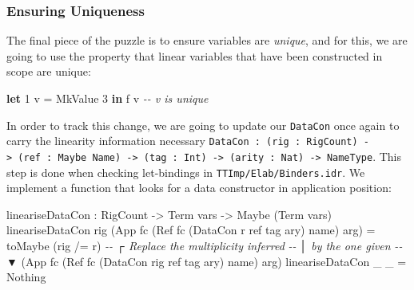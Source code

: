 \documentclass[
]{article}
\newenvironment{Shaded}{}{}
\newcommand{\CommentTok}[1]{\textcolor[rgb]{0.38,0.63,0.69}{\textit{#1}}}
\newcommand{\DataTypeTok}[1]{\textcolor[rgb]{0.56,0.13,0.00}{#1}}
\newcommand{\DecValTok}[1]{\textcolor[rgb]{0.25,0.63,0.44}{#1}}
\newcommand{\KeywordTok}[1]{\textcolor[rgb]{0.00,0.44,0.13}{\textbf{#1}}}
\newcommand{\NormalTok}[1]{#1}
\newcommand{\OperatorTok}[1]{\textcolor[rgb]{0.40,0.40,0.40}{#1}}
\newcommand{\OtherTok}[1]{\textcolor[rgb]{0.00,0.44,0.13}{#1}}
\begin{document}
\hypertarget{ensuring-uniqueness}{%
\subsubsection{Ensuring Uniqueness}\label{ensuring-uniqueness}}

The final piece of the puzzle is to ensure variables are \emph{unique},
and for this, we are going to use the property that linear variables
that have been constructed in scope are unique:

\begin{Shaded}
\begin{Highlighting}[]
\KeywordTok{let} \DecValTok{1}\NormalTok{ v }\OtherTok{=} \DataTypeTok{MkValue} \DecValTok{3} \KeywordTok{in}
\NormalTok{    f v }\CommentTok{{-}{-} v is unique}
\end{Highlighting}
\end{Shaded}

In order to track this change, we are going to update our
\texttt{DataCon} once again to carry the linearity information necessary
\texttt{DataCon\ :\ (rig\ :\ RigCount)\ -\textgreater{}\ (ref\ :\ Maybe\ Name)\ -\textgreater{}\ (tag\ :\ Int)\ -\textgreater{}\ (arity\ :\ Nat)\ -\textgreater{}\ NameType}.
This step is done when checking let-bindings in
\texttt{TTImp/Elab/Binders.idr}. We implement a function that looks for
a data constructor in application position:

\begin{Shaded}
\begin{Highlighting}[]
\NormalTok{lineariseDataCon }\OperatorTok{:} \DataTypeTok{RigCount} \OtherTok{{-}\textgreater{}} \DataTypeTok{Term}\NormalTok{ vars }
                \OtherTok{{-}\textgreater{}} \DataTypeTok{Maybe}\NormalTok{ (}\DataTypeTok{Term}\NormalTok{ vars)}
\NormalTok{lineariseDataCon rig }
\NormalTok{  (}\DataTypeTok{App}\NormalTok{ fc (}\DataTypeTok{Ref}\NormalTok{ fc\textquotesingle{} (}\DataTypeTok{DataCon}\NormalTok{ r ref tag ary) name) arg) }\OtherTok{=}
\NormalTok{    toMaybe }
\NormalTok{      (rig }\OperatorTok{/=}\NormalTok{ r) }\CommentTok{{-}{-}              ┌ Replace the multiplicity inferred}
                 \CommentTok{{-}{-}              │ by the one given}
                 \CommentTok{{-}{-}              ▼}
\NormalTok{      (}\DataTypeTok{App}\NormalTok{ fc (}\DataTypeTok{Ref}\NormalTok{ fc\textquotesingle{} (}\DataTypeTok{DataCon}\NormalTok{ rig ref tag ary) name) arg)}
\NormalTok{lineariseDataCon \_ \_ }\OtherTok{=} \DataTypeTok{Nothing}
\end{Highlighting}
\end{Shaded}
\end{document}
